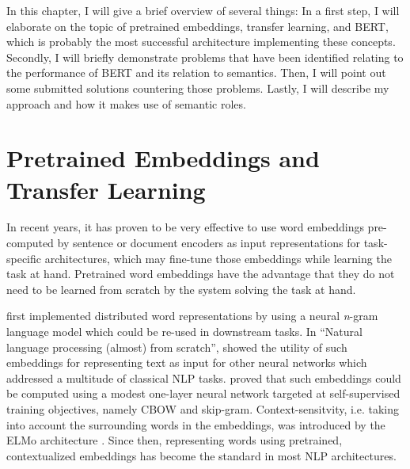 \label{chap:2_approach}



In this chapter, I will give a brief overview of several things: In a first step, I will elaborate
on the topic of pretrained embeddings, transfer learning, and BERT, which is probably the most
successful architecture implementing these concepts. Secondly, I will briefly demonstrate problems
that have been identified relating to the performance of BERT and its relation to semantics. Then,
I will point out some submitted solutions countering those problems. Lastly, I will describe my
approach and how it makes use of semantic roles.



\section{Pretrained Embeddings and Transfer Learning}
\label{sec:pretrained-embeddings}

In recent years, it has proven to be very effective to use word embeddings pre-computed by sentence
or document encoders as input representations for task-specific architectures, which may fine-tune
those embeddings while learning the task at hand. Pretrained word embeddings have the advantage
that they do not need to be learned from scratch by the system solving the task at hand.


\cite{bengio2003neural} first implemented distributed word representations by using a
neural \textit{n}-gram language model which could be re-used in downstream tasks. In
``Natural language processing (almost) from scratch'', \cite{collobert2011natural} showed
the utility of such embeddings for representing text as input for other neural networks
which addressed a multitude of classical NLP tasks. \cite{mikolov2013distributed} proved
that such embeddings could be computed using a modest one-layer neural network targeted at
self-supervised training objectives, namely CBOW and skip-gram. Context-sensitvity, i.e.
taking into account the surrounding words in the embeddings, was introduced by the ELMo
architecture \cite{peng2019transfer}. Since then, representing words using pretrained,
contextualized embeddings has become the standard in most NLP architectures.



